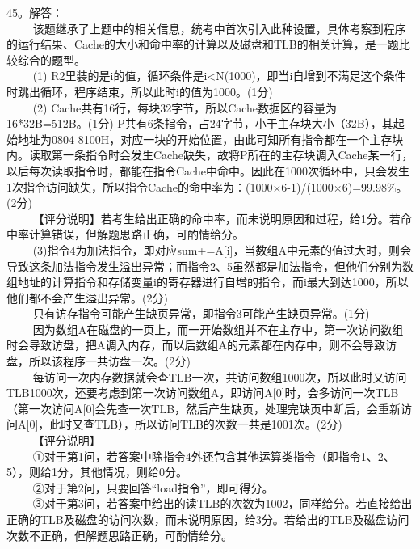 45。解答： \\
$\qquad$ 该题继承了上题中的相关信息，统考中首次引入此种设置，具体考察到程序的运行结果、Cache的大小和命中率的计算以及磁盘和TLB的相关计算，是一题比较综合的题型。 \\
$\qquad$ (1) R2里装的是i的值，循环条件是i<N(1000)，即当i自增到不满足这个条件时跳出循环，程序结束，所以此时i的值为1000。(1分) \\
$\qquad$ (2) Cache共有16行，每块32字节，所以Cache数据区的容量为16*32B=512B。(1分) P共有6条指令，占24字节，小于主存块大小（32B），其起始地址为0804 8100H，对应一块的开始位置，由此可知所有指令都在一个主存块内。读取第一条指令时会发生Cache缺失，故将P所在的主存块调入Cache某一行，以后每次读取指令时，都能在指令Cache中命中。因此在1000次循环中，只会发生1次指令访问缺失，所以指令Cache的命中率为：(1000×6-1)/(1000×6)=99.98\%。(2分) \\
$\qquad$ 【评分说明】若考生给出正确的命中率，而未说明原因和过程，给1分。若命中率计算错误，但解题思路正确，可酌情给分。 \\
$\qquad$ (3)指令4为加法指令，即对应sum+=A[i]，当数组A中元素的值过大时，则会导致这条加法指令发生溢出异常；而指令2、5虽然都是加法指令，但他们分别为数组地址的计算指令和存储变量i的寄存器进行自增的指令，而i最大到达1000，所以他们都不会产生溢出异常。(2分) \\
$\qquad$ 只有访存指令可能产生缺页异常，即指令3可能产生缺页异常。(1分) \\
$\qquad$ 因为数组A在磁盘的一页上，而一开始数组并不在主存中，第一次访问数组时会导致访盘，把A调入内存，而以后数组A的元素都在内存中，则不会导致访盘，所以该程序一共访盘一次。(2分) \\
$\qquad$ 每访问一次内存数据就会查TLB一次，共访问数组1000次，所以此时又访问TLB1000次，还要考虑到第一次访问数组A，即访问A[0]时，会多访问一次TLB（第一次访问A[0]会先查一次TLB，然后产生缺页，处理完缺页中断后，会重新访问A[0]，此时又查TLB），所以访问TLB的次数一共是1001次。(2分) \\
$\qquad$ 【评分说明】 \\
$\qquad$ ①对于第1问，若答案中除指令4外还包含其他运算类指令（即指令1、2、5），则给1分，其他情况，则给0分。 \\
$\qquad$ ②对于第2问，只要回答“load指令”，即可得分。 \\
$\qquad$ ③对于第3问，若答案中给出的读TLB的次数为1002，同样给分。若直接给出正确的TLB及磁盘的访问次数，而未说明原因，给3分。若给出的TLB及磁盘访问次数不正确，但解题思路正确，可酌情给分。

